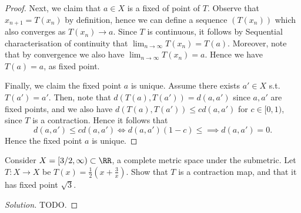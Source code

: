 \begin{proof}
  Next, we claim that $a\in X$ is a fixed of point of $T$. Observe that
  $x_{n+1}=T(x_n)$ by definition, hence we can define a sequence $(T(x_n))$
  which also converges as $T(x_n)\to a$. Since $T$ is continuous, it follows by
  Sequential characterisation of continuity that $\lim_{n\to\infty}T(x_n)=T(a)$.
  Moreover, note that by convergence we also have $\lim_{n\to\infty}T(x_n)=a$.
  Hence we have $T(a)=a$, as fixed point.

  Finally, we claim the fixed point $a$ is unique. Assume there exists $a'\in X$
  s.t. $T(a')=a'$. Then, note that $d(T(a),T(a'))=d(a,a')$ since $a,a'$ are
  fixed points, and we also have $d(T(a),T(a'))\leq cd(a,a')$ for $c\in[0,1)$,
  since $T$ is a contraction. Hence it follows that 
  \[d(a,a')\leq cd(a,a') \iff d(a,a')(1-c) \leq \implies d(a,a')=0.\]
  Hence the fixed point $a$ is unique.
\end{proof}

\begin{exercise}
  Consider $X=[3/2,\infty)\subset\RR$, a complete metric space under the
  submetric. Let $T:X\to X$ be $T(x)=\frac{1}{2}(x+\frac{3}{x})$. Show that $T$
  is a contraction map, and that it has fixed point $\sqrt{3}$.
\end{exercise}
\begin{proof}[Solution]
  TODO.
\end{proof}
